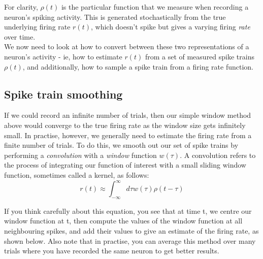 \documentclass{article}
\begin{document}
For clarity, $\rho(t)$ is the particular function that we measure when recording a neuron's spiking activity. This is generated stochastically from the true underlying firing rate $r(t)$, which doesn't spike but gives a varying firing \textit{rate} over time.\\

We now need to look at how to convert between these two representations of a neuron's activity - ie, how to estimate $r(t)$ from a set of measured spike trains $\rho(t)$, and additionally, how to sample a spike train from a firing rate function.

\subsection{Spike train smoothing}

If we could record an infinite number of trials, then our simple window method above would converge to the true firing rate as the window size gets infinitely small. In practise, however, we generally need to estimate the firing rate from a finite number of trials. To do this, we smooth out our set of spike trains by performing a \textit{convolution} with a \textit{window} function $w(\tau)$. A convolution refers to the process of integrating our function of interest with a small sliding window function, sometimes called a kernel, as follows:\\

\begin{equation*}
    r(t) \approx \int_{- \infty}^{\infty} d\tau w(\tau) \rho(t-\tau)
\end{equation*}

If you think carefully about this equation, you see that at time t, we centre our window function at t, then compute the values of the window function at all neighbouring spikes, and add their values to give an estimate of the firing rate, as shown below. Also note that in practise, you can average this method over many trials where you have recorded the same neuron to get better results.\\
\end{document}
